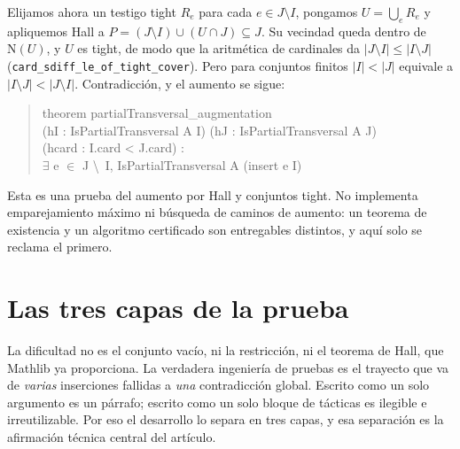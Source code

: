 \documentclass[11pt]{article}
\newcommand{\lean}[1]{\texttt{#1}}
\newcommand{\N}{\mathrm{N}}
\begin{document}
Elijamos ahora un testigo tight $R_e$ para cada $e\in J\setminus I$, pongamos $U=\bigcup_e R_e$ y
apliquemos Hall a $P=(J\setminus I)\cup(U\cap J)\subseteq J$. Su vecindad queda dentro de $\N(U)$, y
$U$ es tight, de modo que la aritmética de cardinales da $|J\setminus I|\le|I\setminus J|$
(\lean{card\_sdiff\_le\_of\_tight\_cover}). Pero para conjuntos finitos $|I|<|J|$ equivale a
$|I\setminus J|<|J\setminus I|$. Contradicción, y el aumento se sigue:
\begin{quote}\ttfamily\small\noindent
theorem partialTransversal\_augmentation\\
\hspace*{1em}(hI : IsPartialTransversal A I) (hJ : IsPartialTransversal A J)\\
\hspace*{1em}(hcard : I.card < J.card) :\\
\hspace*{1em}$\exists$ e $\in$ J \textbackslash\ I, IsPartialTransversal A (insert e I)
\end{quote}
Esta es una prueba del aumento por Hall y conjuntos tight. No implementa emparejamiento máximo ni
búsqueda de caminos de aumento: un teorema de existencia y un algoritmo certificado son entregables
distintos, y aquí solo se reclama el primero.

\section{Las tres capas de la prueba}\label{sec:q3}

La dificultad no es el conjunto vacío, ni la restricción, ni el teorema de Hall, que Mathlib ya
proporciona. La verdadera ingeniería de pruebas es el trayecto que va de \emph{varias} inserciones
fallidas a \emph{una} contradicción global. Escrito como un solo argumento es un párrafo; escrito
como un solo bloque de tácticas es ilegible e irreutilizable. Por eso el desarrollo lo separa en
tres capas, y esa separación es la afirmación técnica central del artículo.
\end{document}
